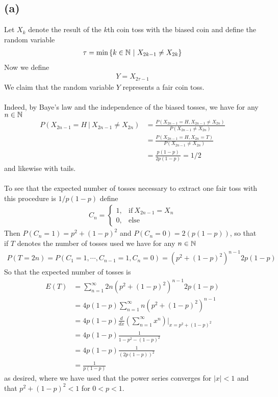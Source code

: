 \subsection*{(a)}
Let $X_k$ denote the result of the $k$th coin toss with the biased coin and define the random variable
\begin{align*}
	\tau=\text{min}\left\{ k \in \mathbb{N} \ | \ X_{2k-1} \neq X_{2k} \right\}
\end{align*}
Now we define
\begin{align*}
	Y= X_{2\tau-1}
\end{align*}
We claim that the random variable $Y$ represents a fair coin toss. \\ \\
Indeed, by Baye's law and the independence of the biased tosses, we have for any $n \in \mathbb{N}$
\begin{align*}
	P(X_{2n-1}=H \ | \ X_{2n-1} \neq X_{2n})&= \frac{P\left( X_{2n-1}=H, X_{2n-1} \neq X_{2n} \right)}{P\left( X_{2n-1} \neq X_{2n} \right)} \\
	&= \frac{P\left( X_{2n-1}=H, X_{2n}=T \right)}{P\left( X_{2n-1} \neq X_{2n} \right)} \\
	&= \frac{p(1-p)}{2p(1-p)}=1/2
\end{align*}
and likewise with tails. \\ \\
To see that the expected number of tosses necessary to extract one fair toss with this procedure is $1/p(1-p)$ define
\begin{align*}
	C_n= \begin{cases}
		1,  & \text{if} \ X_{2n-1}=X_n \\
		0,  & \text{else}
	\end{cases}
\end{align*}
Then $P(C_n =1)=p^2+(1-p)^2$ and $P(C_n=0)=2(p(1-p))$, so that if $T$ denotes the number of tosses used we have for any $n \in \mathbb{N}$
\begin{align*}
	P\left( T=2n \right)=P\left( C_1=1,\cdots,C_{n-1}=1, C_n=0 \right)=(p^2+(1-p)^2)^{n-1}2p(1-p) 
\end{align*}
So that the expected number of tosses is
\begin{align*}
	E\left( T \right)&= \sum_{n=1}^{\infty}2n\left( p^2+(1-p)^2 \right)^{n-1}2p(1-p) \\
	&=4p(1-p) \sum_{n=1}^{\infty}n\left( p^2+(1-p)^2 \right)^{n-1} \\
	&=4p(1-p)\frac{d}{dx}\left( \sum_{n=1}^{\infty}x^n \right)\Bigg|_{x=p^2+(1-p)^2} \\
	&= 4p(1-p)\frac{1}{1-p^2-(1-p)^2} \\
	&=4p(1-p)\frac{1}{(2p(1-p))^2} \\
	&=\frac{1}{p(1-p)}
\end{align*}
as desired, where we have used that the power series converges for $|x|<1$ and that $p^2+(1-p)^2<1$ for $0<p<1$.
